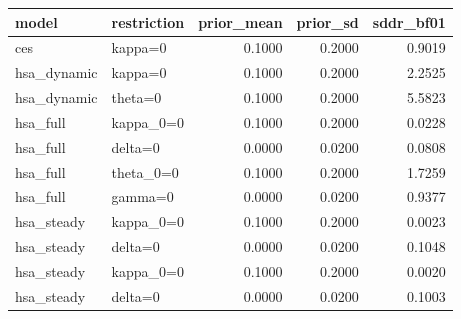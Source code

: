 \begin{tabular}{llrrr}
\toprule
model & restriction & prior\_mean & prior\_sd & sddr\_bf01 \\
\midrule
ces & kappa=0 & 0.1000 & 0.2000 & 0.9019 \\
hsa\_dynamic & kappa=0 & 0.1000 & 0.2000 & 2.2525 \\
hsa\_dynamic & theta=0 & 0.1000 & 0.2000 & 5.5823 \\
hsa\_full & kappa\_0=0 & 0.1000 & 0.2000 & 0.0228 \\
hsa\_full & delta=0 & 0.0000 & 0.0200 & 0.0808 \\
hsa\_full & theta\_0=0 & 0.1000 & 0.2000 & 1.7259 \\
hsa\_full & gamma=0 & 0.0000 & 0.0200 & 0.9377 \\
hsa\_steady & kappa\_0=0 & 0.1000 & 0.2000 & 0.0023 \\
hsa\_steady & delta=0 & 0.0000 & 0.0200 & 0.1048 \\
hsa\_steady & kappa\_0=0 & 0.1000 & 0.2000 & 0.0020 \\
hsa\_steady & delta=0 & 0.0000 & 0.0200 & 0.1003 \\
\bottomrule
\end{tabular}
